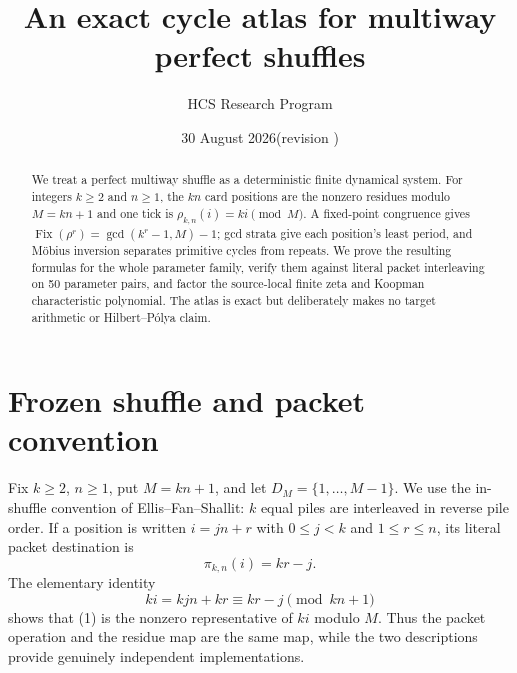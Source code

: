 \documentclass[10pt]{article}
\title{An exact cycle atlas for multiway perfect shuffles}
\author{HCS Research Program}
\date{30 August 2026\quad (revision \CRevisionRound)}
\begin{document}
\maketitle

\begin{abstract}
We treat a perfect multiway shuffle as a deterministic finite dynamical
system.  For integers $k\ge2$ and $n\ge1$, the $kn$ card positions are the
nonzero residues modulo $M=kn+1$ and one tick is
$\rho_{k,n}(i)=ki\pmod M$.  A fixed-point congruence gives
$\operatorname{Fix}(\rho^r)=\gcd(k^r-1,M)-1$; gcd strata give each position's
least period, and Möbius inversion separates primitive cycles from repeats.
We prove the resulting formulas for the whole parameter family, verify them
against literal packet interleaving on 50 parameter pairs, and factor the
source-local finite zeta and Koopman characteristic polynomial.  The atlas is
exact but deliberately makes no target arithmetic or Hilbert--Pólya claim.
\end{abstract}

\section{Frozen shuffle and packet convention}
Fix $k\ge2$, $n\ge1$, put $M=kn+1$, and let
$D_M=\{1,\ldots,M-1\}$.  We use the in-shuffle convention of
Ellis--Fan--Shallit: $k$ equal piles are interleaved in reverse pile order.
If a position is written $i=jn+r$ with $0\le j<k$ and $1\le r\le n$, its
literal packet destination is
\begin{equation}
  \pi_{k,n}(i)=kr-j.                                             \tag{1}
\end{equation}
The elementary identity
\[
  ki=kjn+kr\equiv kr-j\pmod{kn+1}
\]
shows that (1) is the nonzero representative of $ki$ modulo $M$.
Thus the packet operation and the residue map are the same map, while the
two descriptions provide genuinely independent implementations.
\end{document}
